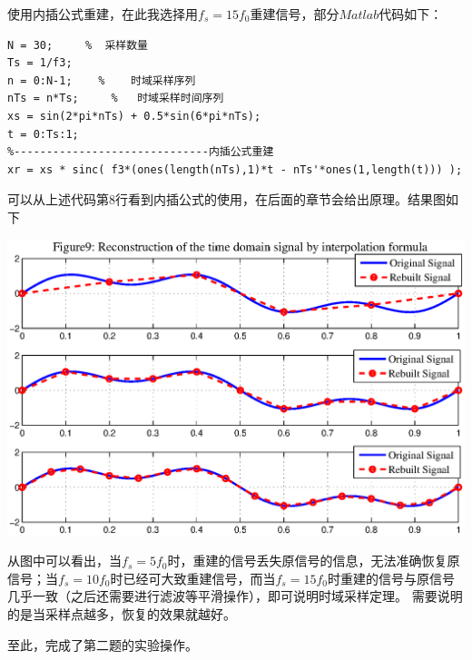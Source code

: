 \documentclass[a4paper,11pt,onecolumn,twoside]{article}
\begin{document}
使用内插公式重建，在此我选择用$f_s=15f_0$重建信号，部分$Matlab$代码如下：

\begin{lstlisting}[style=Matlab-editor,
                   basicstyle=\mlttfamily,
                   caption={Reconstruction Code}, label=code1]
N = 30;     %  采样数量
Ts = 1/f3;
n = 0:N-1;    %    时域采样序列
nTs = n*Ts;     %   时域采样时间序列
xs = sin(2*pi*nTs) + 0.5*sin(6*pi*nTs);
t = 0:Ts:1;
%------------------------------内插公式重建
xr = xs * sinc( f3*(ones(length(nTs),1)*t - nTs'*ones(1,length(t))) );
\end{lstlisting}

可以从上述代码第$8$行看到内插公式的使用，在后面的章节会给出原理。结果图如下
\begin{center}
    \includegraphics[width=1\textwidth]{fig9.eps}
\end{center}
从图中可以看出，当$f_s=5f_0$时，重建的信号丢失原信号的信息，无法准确恢复原信号；当$f_s=10f_0$时已经可大致重建信号，而当$f_s=15f_0$时重建的信号与原信号几乎一致（之后还需要进行滤波等平滑操作），即可说明时域采样定理。
需要说明的是当采样点越多，恢复的效果就越好。

至此，完成了第二题的实验操作。
\end{document}

